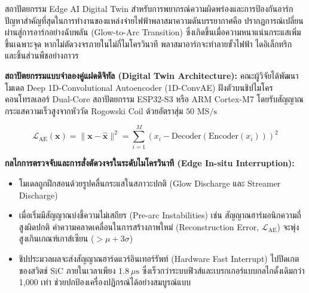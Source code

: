 \begin{aibox}{สถาปัตยกรรม Edge AI Digital Twin สำหรับการพยากรณ์ความผิดพร่องและการป้องกันอาร์ก}
ปัญหาสำคัญที่สุดในการทำงานของแหล่งจ่ายไฟฟ้าพลาสมาความดันบรรยากาศคือ ปรากฏการณ์เปลี่ยนผ่านสู่การอาร์กอย่างฉับพลัน (Glow-to-Arc Transition) ซึ่งเกิดขึ้นเมื่อความหนาแน่นกระแสเพิ่มขึ้นเฉพาะจุด หากไม่ตัดวงจรภายในไม่กี่ไมโครวินาที พลาสมาอาร์กจะทำลายขั้วไฟฟ้า ไดอิเล็กทริก และชิ้นส่วนพืชอย่างถาวร

\textbf{สถาปัตยกรรมแบบจำลองคู่แฝดดิจิทัล (Digital Twin Architecture):}
คณะผู้วิจัยได้พัฒนาโมเดล Deep 1D-Convolutional Autoencoder (1D-ConvAE) ฝังตัวบนชิปไมโครคอนโทรลเลอร์ Dual-Core สถาปัตยกรรม ESP32-S3 หรือ ARM Cortex-M7 โดยรับสัญญาณกระแสความเร็วสูงจากหัววัด Rogowski Coil ด้วยอัตราสุ่ม $50 \text{ MS/s}$

\begin{equation}
    \mathcal{L}_{\text{AE}}(\mathbf{x}) = \|\mathbf{x} - \hat{\mathbf{x}}\|^2 = \sum_{i=1}^M \left( x_i - \text{Decoder}(\text{Encoder}(x_i)) \right)^2
\end{equation}

\textbf{กลไกการตรวจจับและการสั่งตัดวงจรในระดับไมโครวินาที (Edge In-situ Interruption):}
\begin{itemize}
    \item โมเดลถูกฝึกสอนด้วยรูปคลื่นกระแสในสภาวะปกติ (Glow Discharge และ Streamer Discharge)
    \item เมื่อเริ่มมีสัญญาณบ่งชี้ความไม่เสถียร (Pre-arc Instabilities) เช่น สัญญาณฮาร์มอนิกความถี่สูงผิดปกติ ค่าความคลาดเคลื่อนในการสร้างภาพใหม่ (Reconstruction Error, $\mathcal{L}_{\text{AE}}$) จะพุ่งสูงเกินเกณฑ์เกาส์เซียน ($> \mu + 3\sigma$)
    \item ชิปประมวลผลจะส่งสัญญาณฮาร์ดแวร์อินเทอร์รัพท์ (Hardware Fast Interrupt) ไปปิดเกตของสวิตช์ SiC ภายในเวลาเพียง $1.8 \ \mu\text{s}$ ซึ่งเร็วกว่าระบบฟิวส์และเบรกเกอร์แบบกลไกดั้งเดิมกว่า 1,000 เท่า ช่วยปกป้องเครื่องปฏิกรณ์ได้อย่างสมบูรณ์แบบ
\end{itemize}
\end{aibox}

